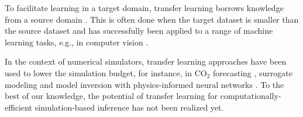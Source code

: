
To facilitate learning in a target domain, transfer learning borrows knowledge from a source domain \cite{panigrahi_survey_2021}. This is often done when the target dataset is smaller than the source dataset \cite{larsen-freeman_transfer_2013} and has successfully been applied to a range of machine learning tasks, e.g., in computer vision \cite{jiang_face_2017, hussain_study_2019}. 

In the context of numerical simulators, transfer learning approaches have been used to lower the simulation budget, for instance, in CO$_2$ forecasting \cite{falola_rapid_2023}, surrogate modeling \cite{wang_local_2024} and model inversion with physics-informed neural networks \cite{haghighat_physics-informed_2021}. To the best of our knowledge, the potential of transfer learning for computationally-efficient simulation-based inference has not been realized yet.







